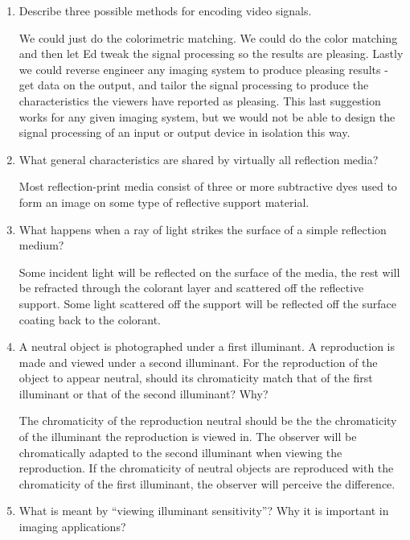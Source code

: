 \begin{enumerate}
 \item
 Describe three possible methods for encoding video signals. \newline
 \par We could just do the colorimetric matching.  We could do the color matching and then let Ed tweak the signal processing so the results are pleasing.  Lastly we could reverse engineer any imaging system to produce pleasing results - get data on the output, and tailor the signal processing to produce the characteristics the viewers have reported as pleasing.  This last suggestion works for any given imaging system, but we would not be able to design the signal processing of an input or output device in isolation this way.
 \item
  What general characteristics are shared by virtually all reflection media? \newline
 \par  Most reflection-print media consist of three or more subtractive dyes used to form an image on some type of reflective support material. \newline
 \item
  What happens when a ray of light strikes the surface of a simple reflection medium? \newline
 \par Some incident light will be reflected on the surface of the media, the rest will be refracted through the colorant layer and scattered off the reflective support. Some light scattered off the support will be reflected off the surface coating back to the colorant. \newline
 \item
  A neutral object is photographed under a first illuminant. A reproduction is made and viewed under a second illuminant. For the reproduction of the object to appear neutral, should its chromaticity match that of the first illuminant or that of the second illuminant? Why? \newline
 \par The chromaticity of the reproduction neutral should be the the chromaticity of the illuminant the reproduction is viewed in.  The observer will be chromatically adapted to the second illuminant when viewing the reproduction.  If the chromaticity of neutral objects are reproduced with the chromaticity of the first illuminant, the observer will perceive the difference. \newline
 \item
  What is meant by “viewing illuminant sensitivity”? Why it is important in imaging applications? \newline

\end{enumerate}
